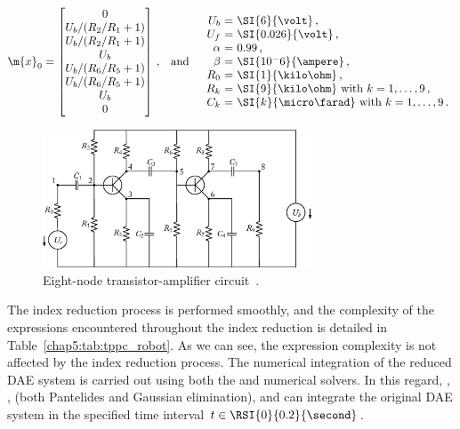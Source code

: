 \begin{equation*}
  \m{x}_0 = \begin{bmatrix}
    0 \\
    U_b/(R_2/R_1 + 1) \\
    U_b/(R_2/R_1 + 1) \\
    U_b \\
    U_b/(R_6/R_5 + 1) \\
    U_b/(R_6/R_5 + 1) \\
    U_b \\
    0 \\
  \end{bmatrix} \, \text{,}
  \quad \text{and} \quad
  \begin{array}{r@{~}c@{~}l}
    U_b    &=& \SI{6}{\volt} \, \text{,} \\
    U_f    &=& \SI{0.026}{\volt} \, \text{,} \\
    \alpha &=& 0.99 \, \text{,} \\
    \beta  &=& \SI{10^-6}{\ampere} \, \text{,} \\
    R_0    &=& \SI{1}{\kilo\ohm} \, \text{,} \\
    R_k    &=& \SI{9}{\kilo\ohm} ~ \text{with} ~ k=1, \dots, 9 \, \text{,} \\
    C_k    &=& \SI{k}{\micro\farad} ~ \text{with} ~ k=1, \dots, 9 \, \text{.} \\
  \end{array}
\end{equation*}

\begin{figure}
  \centering
  \includegraphics[width=8.0cm]{figures/chapter_5/transistor_amplifier.eps}
  \caption{Eight-node transistor-amplifier circuit~\cite{lioen1998test, mazzia2008test}.}
  \label{chap5:fig:transistor_amplifier}
\end{figure}

The index reduction process is performed smoothly, and the complexity of the expressions encountered throughout the index reduction is detailed in Table~\ref{chap5:tab:tppc_robot}. As we can see, the expression complexity is not affected by the index reduction process. The numerical integration of the reduced \ac{DAE} system is carried out using both the \Maple{} and \Indigo{} numerical solvers. In this regard, \Maple{}, \Mathematica{}, \Matlab{} (both Pantelides and Gaussian elimination), and \Indigo{} can integrate the original \ac{DAE} system in the specified time interval $t \in \RSI{0}{0.2}{\second}$.


